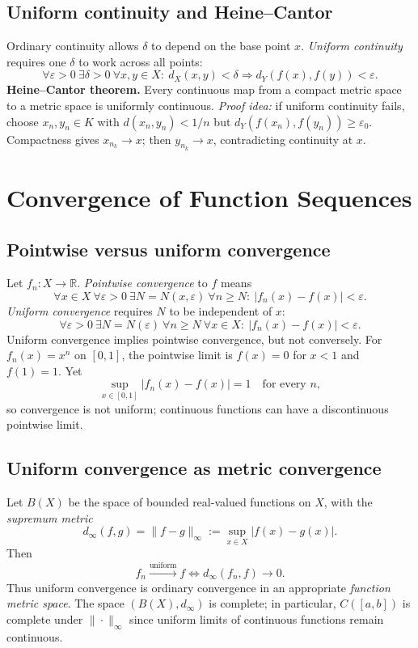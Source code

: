 \documentclass[10pt,a4paper]{article}
\newcommand{\R}{\mathbb R}
\newcommand{\eps}{\varepsilon}
\begin{document}
\subsection{Uniform continuity and Heine--Cantor}
Ordinary continuity allows $\delta$ to depend on the base point $x$. \emph{Uniform continuity} requires one $\delta$ to work across all points:
\[
\boxed{\forall\eps>0\ \exists\delta>0\ \forall x,y\in X:\
d_X(x,y)<\delta\Rightarrow d_Y(f(x),f(y))<\eps.}
\]
\textbf{Heine--Cantor theorem.} Every continuous map from a compact metric space to a metric space is uniformly continuous. \emph{Proof idea:} if uniform continuity fails, choose $x_n,y_n\in K$ with $d(x_n,y_n)<1/n$ but $d_Y(f(x_n),f(y_n))\ge\eps_0$. Compactness gives $x_{n_k}\to x$; then $y_{n_k}\to x$, contradicting continuity at $x$.

\section{Convergence of Function Sequences}
\subsection{Pointwise versus uniform convergence}
Let $f_n:X\to\R$. \emph{Pointwise convergence} to $f$ means
\[
\forall x\in X\ \forall\eps>0\ \exists N=N(x,\eps)\ \forall n\ge N:\ |f_n(x)-f(x)|<\eps.
\]
\emph{Uniform convergence} requires $N$ to be independent of $x$:
\[
\boxed{\forall\eps>0\ \exists N=N(\eps)\ \forall n\ge N\ \forall x\in X:\ |f_n(x)-f(x)|<\eps.}
\]
Uniform convergence implies pointwise convergence, but not conversely. For $f_n(x)=x^n$ on $[0,1]$, the pointwise limit is $f(x)=0$ for $x<1$ and $f(1)=1$. Yet
\[
\sup_{x\in[0,1]}|f_n(x)-f(x)|=1\quad\text{for every }n,
\]
so convergence is not uniform; continuous functions can have a discontinuous pointwise limit.

\subsection{Uniform convergence as metric convergence}
Let $B(X)$ be the space of bounded real-valued functions on $X$, with the \emph{supremum metric}
\[
d_\infty(f,g)=\|f-g\|_\infty:=\sup_{x\in X}|f(x)-g(x)|.
\]
Then
\[
\boxed{f_n\xrightarrow{\mathrm{uniform}}f\iff d_\infty(f_n,f)\to0.}
\]
Thus uniform convergence is ordinary convergence in an appropriate \emph{function metric space}. The space $(B(X),d_\infty)$ is complete; in particular, $C([a,b])$ is complete under $\|\cdot\|_\infty$ since uniform limits of continuous functions remain continuous.
\end{document}
